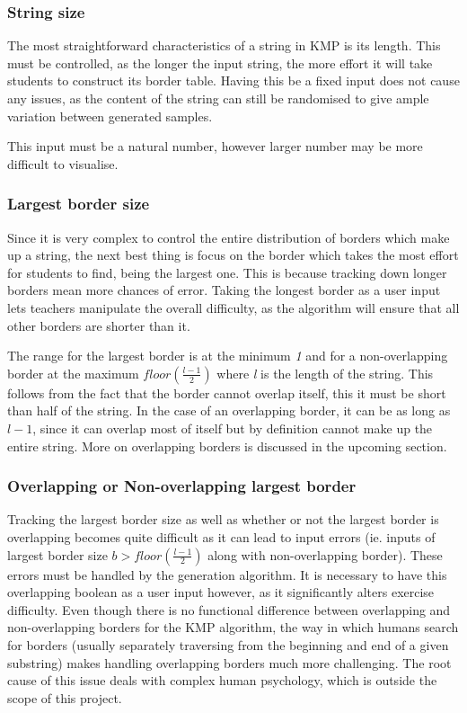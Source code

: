 \documentclass{l4proj}
\begin{document}
\subsubsection{String size}

The most straightforward characteristics of a string in KMP is its length. This must be controlled, as the longer the input string, the more effort it will take students to construct its border table. Having this be a fixed input does not cause any issues, as the content of the string can still be randomised to give ample variation between generated samples.

This input must be a natural number, however larger number may be more difficult to visualise.

\subsubsection{Largest border size}

Since it is very complex to control the entire distribution of borders which make up a string, the next best thing is focus on the border which takes the most effort for students to find, being the largest one. This is because tracking down longer borders mean more chances of error. Taking the longest border as a user input lets teachers manipulate the overall difficulty, as the algorithm will ensure that all other borders are shorter than it.

The range for the largest border is at the minimum \emph{1} and for a non-overlapping border at the maximum $floor(\frac{l-1}{2})$ where \emph{l} is the length of the string. This follows from the fact that the border cannot overlap itself, this it must be short than half of the string. In the case of an overlapping border, it can be as long as $l-1$, since it can overlap most of itself but by definition cannot make up the entire string. More on overlapping borders is discussed in the upcoming section.

\subsubsection{Overlapping or Non-overlapping largest border}

Tracking the largest border size as well as whether or not the largest border is overlapping becomes quite difficult as it can lead to input errors (ie. inputs of largest border size $b > floor(\frac{l-1}{2})$ along with non-overlapping border). These errors must be handled by the generation algorithm. It is necessary to have this overlapping boolean as a user input however, as it significantly alters exercise difficulty. Even though there is no functional difference between overlapping and non-overlapping borders for the KMP algorithm, the way in which humans search for borders (usually separately traversing from the beginning and end of a given substring) makes handling overlapping borders much more challenging. The root cause of this issue deals with complex human psychology, which is outside the scope of this project. \cite{a}
\end{document}
